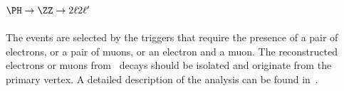 
\subsection{$\PH \to \ZZ \to 2\ell 2\ell '$}

The events are selected by the triggers that require the presence of a
pair of electrons, or a pair of muons, or
an electron and a muon.
The reconstructed electrons or muons from \cPZ\ decays should be isolated and 
originate from the
primary vertex. A detailed description of the analysis can 
be found in~\cite{cmsobsboson,Chatrchyan:2012dg,Chatrchyan:2012hr}.  

